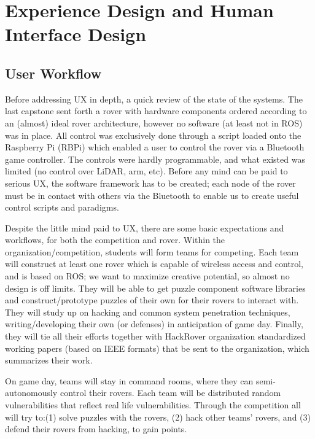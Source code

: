 \documentclass[a4paper, 10pt]{article}
\begin{document}
\pagebreak
	
\section{Experience Design and Human Interface Design}
	\subsection{User Workflow}
	Before addressing UX in depth, a quick review of the state of the systems. The last capstone sent forth a rover with hardware components ordered according to an (almost) ideal rover architecture, however no software (at least not in ROS) was in place. All control was exclusively done through a script loaded onto the Raspberry Pi (RBPi) which enabled a user to control the rover via a Bluetooth game controller. The controls were hardly programmable, and what existed was limited (no control over LiDAR, arm, etc). Before any mind can be paid to serious UX, the software framework has to be created; each node of the rover must be in contact with others via the Bluetooth to enable us to create useful control scripts and paradigms.  

	Despite the little mind paid to UX, there are some basic expectations and workflows, for both the competition and rover. Within the organization/competition, students will form teams for competing. Each team will construct at least one rover which is capable of wireless access and control, and is based on ROS; we want to maximize creative potential, so almost no design is off limits. They will be able to get puzzle component software libraries and construct/prototype puzzles of their own for their rovers to interact with. They will study up on hacking and common system penetration techniques, writing/developing their own (or defenses) in anticipation of game day. Finally, they will tie all their efforts together with HackRover organization standardized working papers (based on IEEE formats) that be sent to the organization, which summarizes their work.
	
	On game day, teams will stay in command rooms, where they can semi-autonomously control their rovers. Each team will be distributed random vulnerabilities that reflect real life vulnerabilities. Through the competition all will try to:(1) solve puzzles with the rovers, (2) hack other teams' rovers, and (3) defend their rovers from hacking, to gain points.
	
\end{document}
